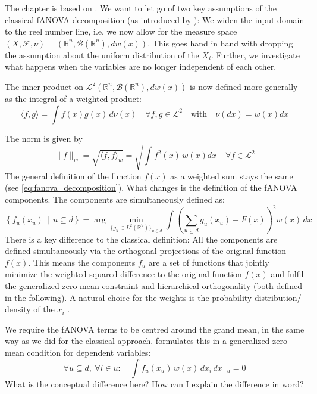 The chapter is based on \cite{hooker2007}. We want to let go of two key assumptions of the classical fANOVA decomposition (as introduced by \cite{sobol1993sensitivity}): We widen the input domain to the reel number line, i.e. we now allow for the measure space $(X, \mathcal{F}, \nu) = (\mathbb{R}^n, \mathcal{B}(\mathbb{R}^n), dw(x))$. This goes hand in hand with dropping the assumption about the uniform distribution of the $X_i$. Further, we investigate what happens when the variables are no longer independent of each other.\par
The inner product on $\mathcal{L}^2(\mathbb{R}^n, \mathcal{B}(\mathbb{R}^n), dw(x))$ is now defined more generally as the integral of a weighted product:
\[
\langle f, g \rangle = \int f(x) g(x) \, d\nu(x) \quad \forall f, g \in \mathcal{L}^2 \quad \text{with} \quad \nu(dx) = w(x)dx
\]

The norm is given by 
\[
\|f\|_{w} = \sqrt{\langle f, f \rangle_{w}} = \sqrt{\int f^2(x) \, w(x)dx} \quad \forall f \in \mathcal{L}^2
\]
The general definition of the function $f(x)$ as a weighted sum stays the same (see \autoref{eq:fanova_decomposition}). What changes is the definition of the fANOVA components. The components are simultaneously defined as:
\begin{equation}
\left\{ f_u(x_u) \,\middle|\, u \subseteq d \right\}
= \arg\min_{\{g_u \in L^2(\mathbb{R}^u)\}_{u \subseteq d}} 
\int \left( \sum_{u \subseteq d} g_u(x_u) - F(x) \right)^2 w(x) \, dx
\label{eq:fanova_decomposition_generalized}
\end{equation}
There is a key difference to the classical definition: All the components are defined simultaneously via the orthogonal projections of the original function $f(x)$. This means the components $f_u$ are a set of functions that jointly minimize the weighted squared difference to the original function $f(x)$ and fulfil the generalized zero-mean constraint and hierarchical orthogonality (both defined in the following). A natural choice for the weights is the probability distribution/ density of the $x_i$ \citep{hooker2007}.\par

We require the fANOVA terms to be centred around the grand mean, in the same way as we did for the classical approach.
\cite{hooker2007} formulates this in a generalized zero-mean condition for dependent variables:
\begin{equation}
\forall u \subseteq d,\ \forall i \in u: \quad 
\int f_u(x_u)\, w(x)\, dx_i\, dx_{-u} = 0
\label{eq:zero_mean_condition_generalized}
\end{equation}
{\color{blue}What is the conceptual difference here? How can I explain the difference in word?}

